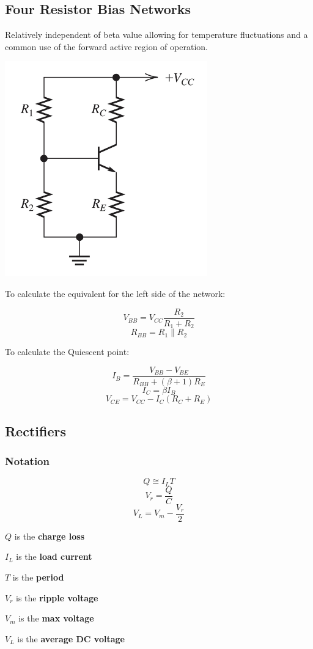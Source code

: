 \documentclass{article}
\begin{document}
\subsection*{Four Resistor Bias Networks}
\begin{center}
    Relatively independent of beta value allowing for temperature fluctuations and a common use of the forward active region of operation.

    \includegraphics[width = .2\textwidth]{FRBnetwork.png}
    
    To calculate the equivalent for the left side of the network:
\end{center}
\begin{equation}
    V_{BB} = V_{CC} \frac{R_2}{R_1+R_2}
\end{equation}
\begin{equation}
    R_{BB} =  R_1 \parallel R_2
\end{equation}
\begin{center}
    To calculate the Quiescent point:
\end{center}
\begin{equation}
    I_B = \frac{V_{BB} - V_{BE}}{R_{BB} + (\beta +1) R_E}
\end{equation}
\begin{equation}
    I_C = \beta I_B
\end{equation}
\begin{equation}
    V_{CE} = V_{CC} - I_C (R_C + R_E)
\end{equation}
\subsection*{Rectifiers}
\subsubsection*{Notation}
\begin{equation}
    Q \cong I_L T
\end{equation}
\begin{equation}
    V_r = \frac{Q}{C}
\end{equation} 
\begin{equation}
    V_L = V_m - \frac{V_r}{2}
\end{equation}
\begin{center}
    $Q$ is the \textbf{charge loss}
    
    $I_L$ is the \textbf{load current}
    
    $T$ is the \textbf{period}
    
    $V_r$ is the \textbf{ripple voltage}
    
    $V_m$ is the \textbf{max voltage}
    
    $V_L$ is the \textbf{average DC voltage}
\end{center}
\end{document}
